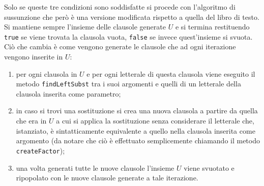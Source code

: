 \documentclass[a4paper,11pt]{article}
\begin{document}
Solo se queste tre condizioni sono soddisfatte si procede con l'algoritmo di sussunzione che però è una versione modificata rispetto a quella del libro di testo. Si mantiene sempre l'insieme delle clausole generate $U$ e si termina restituendo \texttt{true} se viene trovata la clausola vuota, \texttt{false} se invece quest'insieme si svuota. Ciò che cambia è come vengono generate le clausole che ad ogni iterazione vengono inserite in $U$:
\begin{enumerate}
\item per ogni clausola in $U$ e per ogni letterale di questa clausola viene eseguito il metodo \texttt{findLeftSubst} tra i suoi argomenti e quelli di un letterale della clausola inserita come parametro;
\item in caso si trovi una sostituzione si crea una nuova clausola a partire da quella che era in $U$ a cui si applica la sostituzione senza considerare il letterale che, istanziato, è sintatticamente equivalente a quello nella clausola inserita come argomento (da notare che ciò è effettuato semplicemente chiamando il metodo \texttt{createFactor});
\item una volta generati tutte le nuove clausole l'insieme $U$ viene svuotato e ripopolato con le nuove clausole generate a tale iterazione.
\end{enumerate}
\end{document}
